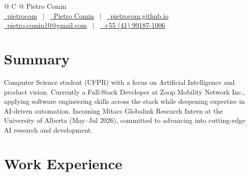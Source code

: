 \documentclass[a4paper,12pt]{article}
\begin{document}
\pagestyle{empty} 



\begin{tabularx}{\linewidth}{@{} C @{}}
\Huge{Pietro Comin} \\[7.5pt]
\href{https://github.com/pietrocom}{\raisebox{-0.05\height}\faGithub\ pietrocom} \ $|$ \ 
\href{https://linkedin.com/in/pietro-comin}{\raisebox{-0.05\height}\faLinkedin\ Pietro Comin} \ $|$ \ 
\href{https://pietrocom.github.io/}{\raisebox{-0.05\height}\faGlobe \ pietrocom.github.io} \\
\href{mailto:pietro.comin10@gmail.com}{\raisebox{-0.05\height}\faEnvelope \ pietro.comin10@gmail.com} \ $|$ \ 
\href{tel:+55(41)991871006}{\raisebox{-0.05\height}\faMobile \ +55 (41) 99187-1006} \\
\end{tabularx}


\section{Summary}
Computer Science student (UFPR) with a focus on Artificial Intelligence and product vision. Currently a Full-Stack Developer at Zoop Mobility Network Inc., applying software engineering skills across the stack while deepening expertise in AI-driven automation. Incoming Mitacs Globalink Research Intern at the University of Alberta (May--Jul 2026), committed to advancing into cutting-edge AI research and development.

\section{Work Experience}
\end{document}
